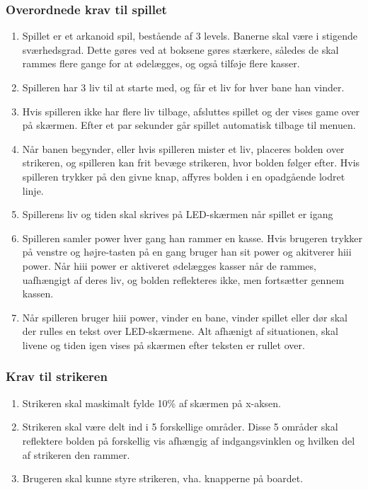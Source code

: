\subsubsection{Overordnede krav til spillet}
\begin{enumerate}
\item Spillet er et arkanoid spil, bestående af 3 levels. Banerne skal være i stigende sværhedsgrad. Dette gøres ved at boksene gøres stærkere, således de skal rammes flere gange for at ødelægges, og også tilføje flere kasser.
\item Spilleren har 3 liv til at starte med, og får et liv for hver bane han vinder.
\item Hvis spilleren ikke har flere liv tilbage, afsluttes spillet og der vises game over på skærmen. Efter et par sekunder går spillet automatisk tilbage  til menuen.
\item Når banen begynder, eller hvis spilleren mister et liv, placeres bolden over strikeren, og spilleren kan frit bevæge strikeren, hvor bolden følger efter. Hvis spilleren trykker på den givne knap, affyres bolden i en opadgående lodret linje. 
\item Spillerens liv og tiden skal skrives på LED-skærmen når spillet er igang
\item Spilleren samler power hver gang han rammer en kasse. Hvis brugeren trykker på venstre og højre-tasten på en gang bruger han sit power og akitverer hiii power. Når hiii power er aktiveret ødelægges kasser når de rammes, uafhængigt af deres liv, og bolden reflekteres ikke, men fortsætter gennem kassen.
\item Når spilleren bruger hiii power, vinder en bane, vinder spillet eller dør skal der rulles en tekst over LED-skærmene. Alt afhænigt af situationen, skal livene og tiden igen vises på skærmen efter teksten er rullet over.
\end{enumerate}
\subsubsection{Krav til strikeren}
\begin{enumerate}
\item Strikeren skal maskimalt fylde 10\% af skærmen på x-aksen. 
\item  Strikeren skal være delt ind i 5 forskellige områder. Disse 5 områder skal reflektere bolden på forskellig vis afhængig af indgangsvinklen og hvilken del af strikeren den rammer. 
\item Brugeren skal kunne styre strikeren, vha. knapperne på boardet.
\end{enumerate}

